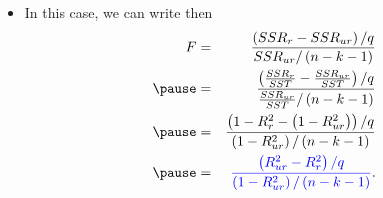 \documentclass[notes=show,compress,beamer]{beamer}
\begin{document}
\begin{frame}%


\begin{itemize}
\item In this case, we can write then%
\begin{eqnarray*}
F &=&\frac{\left( SSR_{r}-SSR_{ur}\right) /q}{SSR_{ur}/\left( n-k-1\right) }
\\
\pause
&=&\frac{\left( \frac{SSR_{r}}{SST}-\frac{SSR_{ur}}{SST}\right) /q}{\frac{%
SSR_{ur}}{SST}/\left( n-k-1\right) } \\
\pause
&=&\frac{\left( 1-R_{r}^{2}-\left( 1-R_{ur}^{2}\right) \right) /q}{\left(
1-R_{ur}^{2}\right) /\left( n-k-1\right) } \\
\pause
&=&%
\color{blue}%
\frac{\left( R_{ur}^{2}-R_{r}^{2}\right) /q}{\left( 1-R_{ur}^{2}\right)
/\left( n-k-1\right) }%
\color{black}%
.
\end{eqnarray*}
\end{itemize}

\end{frame}%
\end{document}
